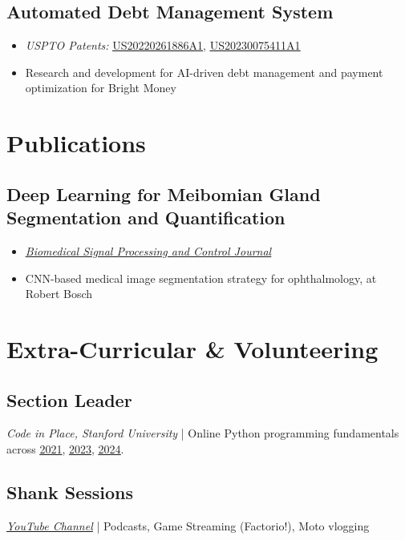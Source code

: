 \documentclass[11pt,letterpaper]{article}
\let\oldhref\href
\renewcommand{\href}[2]{\uline{\oldhref{#1}{#2}}}
\begin{document}
\subsection{Automated Debt Management System}
\begin{itemize}
    \item \textit{USPTO Patents:} \href{https://patents.google.com/patent/US20220261886A1}{US20220261886A1}, \href{https://patents.google.com/patent/US20230075411A1/}{US20230075411A1}
    \item Research and development for AI-driven debt management and payment optimization for Bright Money
\end{itemize}

\section{Publications}
\subsection{Deep Learning for Meibomian Gland Segmentation and Quantification}
\begin{itemize}
    \item \textit{\href{https://www.sciencedirect.com/science/article/abs/pii/S174680941930357X}{Biomedical Signal Processing and Control Journal}}
    \item CNN-based medical image segmentation strategy for ophthalmology, at Robert Bosch
\end{itemize}

\section{Extra-Curricular \& Volunteering}

\subsection{Section Leader}
\textit{Code in Place, Stanford University} | Online Python programming fundamentals across \href{https://knhash.in/files/CodeInPlace.pdf}{2021}, \href{https://knhash.in/files/CodeInPlace2023.pdf}{2023}, \href{https://knhash.in/files/CodeInPlace2024.pdf}{2024}.

\subsection{Shank Sessions}
\textit{\href{https://youtube.com/@ShankSessions}{YouTube Channel}} | Podcasts, Game Streaming (Factorio!), Moto vlogging
\end{document}
